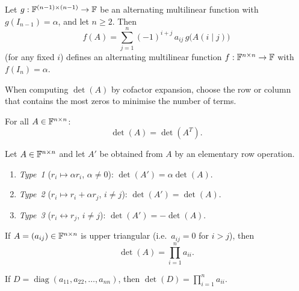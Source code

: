 \begin{propbox}
\label{prop:det-from-lower}
Let $g:\mathbb{F}^{(n-1)\times(n-1)}\to\mathbb{F}$ be an alternating multilinear function
with $g(I_{n-1})=\alpha$, and let $n\ge 2$.  Then
\[
    f(A) = \sum_{j=1}^{n}(-1)^{i+j}\,a_{ij}\,g\!\bigl(A(i\mid j)\bigr)
\]
(for any fixed $i$) defines an alternating multilinear function
$f:\mathbb{F}^{n\times n}\to\mathbb{F}$ with $f(I_n)=\alpha$.
\end{propbox}

\begin{methodbox}
When computing $\det(A)$ by cofactor expansion, choose the row or column
that contains the most zeros to minimise the number of terms.
\end{methodbox}

\begin{propbox}
\label{prop:det-transpose}
For all $A\in\mathbb{F}^{n\times n}$:
\[
    \det(A) = \det(A^T).
\]
\end{propbox}

\begin{propbox}
\label{prop:det-row-ops}
Let $A\in\mathbb{F}^{n\times n}$ and let $A'$ be obtained from $A$ by an
elementary row operation.
\begin{enumerate}[label=\textbf{(\roman*)}]
    \item \emph{Type~1} ($r_i\mapsto\alpha r_i$, $\alpha\neq 0$):
          $\det(A')=\alpha\det(A)$.
    \item \emph{Type~2} ($r_i\mapsto r_i+\alpha r_j$, $i\neq j$):
          $\det(A')=\det(A)$.
    \item \emph{Type~3} ($r_i\leftrightarrow r_j$, $i\neq j$):
          $\det(A')=-\det(A)$.
\end{enumerate}
\end{propbox}

\begin{propbox}
\label{prop:det-triangular}
If $A=(a_{ij})\in\mathbb{F}^{n\times n}$ is upper triangular (i.e.\
$a_{ij}=0$ for $i>j$), then
\[
    \det(A) = \prod_{i=1}^{n} a_{ii}.
\]
\end{propbox}

\begin{corbox}
If $D=\operatorname{diag}(a_{11},a_{22},\ldots,a_{nn})$, then
$\det(D)=\prod_{i=1}^n a_{ii}$.
\end{corbox}

